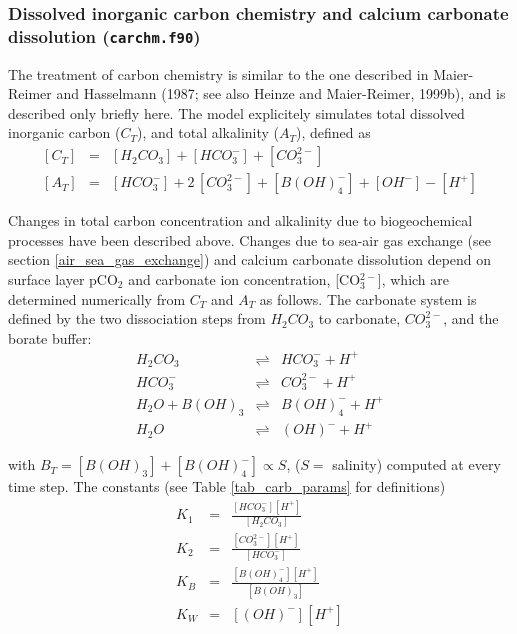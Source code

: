 \documentclass[11pt,a4paper,fleqn,twoside]{article}
\begin{document}
\subsubsection{\label{dic_chemistry}Dissolved inorganic carbon chemistry and
calcium carbonate dissolution ({\tt carchm.f90})}

The treatment of carbon chemistry is similar to the one described in 
Maier-Reimer and Hasselmann  (1987\nocite{maier-reimer:1987}; see also Heinze
and Maier-Reimer, 1999b\nocite{heinze:1999b}), and is described only briefly here.
The model explicitely simulates total dissolved inorganic carbon ($C_T$),
and total alkalinity ($A_T$),  defined as 
\begin{eqnarray}
\label{eq_ct}
\left[C_T\right] & = & \left[H_2CO_3\right] + \left[HCO_3^-\right] + \left[CO_3^{2-}\right] \\
\label{eq_at}
\left[A_T\right] & = &  \left[HCO_3^-\right] + 2\,\left[CO_3^{2-}\right] + \left[B(OH)_4^-\right] + \left[OH^-\right] - \left[H^+\right] 
\end{eqnarray}

Changes in total carbon concentration and alkalinity due to biogeochemical
processes have been described above. Changes due to sea-air gas exchange (see
section \ref{air_sea_gas_exchange}) and calcium carbonate dissolution depend on
surface layer pCO$_2$ and carbonate ion concentration, [CO$_3^{2-}$], which are
determined numerically from $C_T$ and $A_T$ as follows. 
The carbonate system is defined by the two dissociation steps from $H_2CO_3$ to
carbonate, $CO_3^{2-}$, and the borate buffer:
\begin{eqnarray}
H_2CO_3 & \rightleftharpoons & HCO_3^- + H^+ \\
HCO_3^- & \rightleftharpoons & CO_3^{2-} + H^+  \\
H_2O + B(OH)_3 & \rightleftharpoons & B(OH)_4^- + H^+ \\ 
H_2O & \rightleftharpoons & (OH)^- + H^+ 
\end{eqnarray}

with $B_T = \left[B(OH)_3\right] + \left[B(OH)_4^-\right] \propto S$, ($S = $
salinity) computed at every time step. The constants (see Table \ref{tab_carb_params}
for definitions)
\begin{eqnarray}
K_1& = & \frac{\left[HCO_3^-\right]\left[H^+\right]}{\left[H_2CO_3 \right]} \\
K_2& = & \frac{\left[CO_3^{2-}\right]\left[H^+\right]}{\left[HCO_3^- \right]}  \\
K_B& = & \frac{\left[B(OH)_4^-\right]\left[H^+\right]}{\left[B(OH)_3\right]} \\ 
K_W& = & \left[(OH)^-\right] \left[H^+\right] 
\end{eqnarray}
\end{document}
